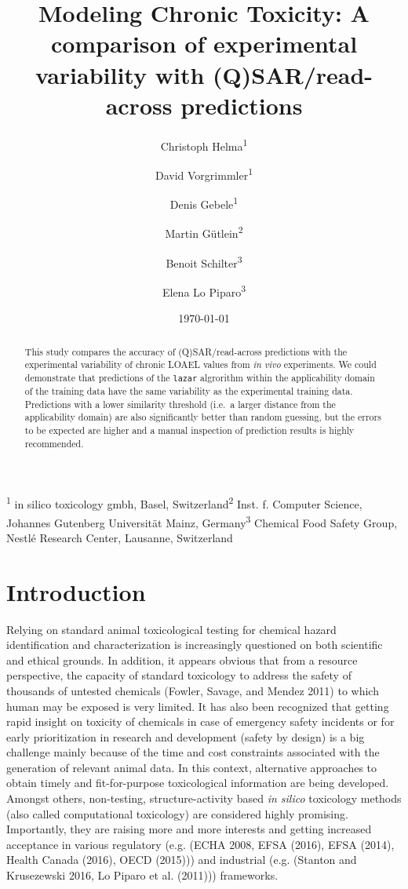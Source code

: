 \documentclass[]{achemso}
\title{Modeling Chronic Toxicity: A comparison of experimental variability with
(Q)SAR/read-across predictions}
\author{Christoph Helma\textsuperscript{1} \and David Vorgrimmler\textsuperscript{1} \and Denis Gebele\textsuperscript{1} \and Martin Gütlein\textsuperscript{2} \and Benoit Schilter\textsuperscript{3} \and Elena Lo Piparo\textsuperscript{3}}
\date{\today}
\begin{document}
\maketitle
\begin{abstract}
This study compares the accuracy of (Q)SAR/read-across predictions with
the experimental variability of chronic LOAEL values from \emph{in vivo}
experiments. We could demonstrate that predictions of the \texttt{lazar}
algrorithm within the applicability domain of the training data have the
same variability as the experimental training data. Predictions with a
lower similarity threshold (i.e.~a larger distance from the
applicability domain) are also significantly better than random
guessing, but the errors to be expected are higher and a manual
inspection of prediction results is highly recommended.
\end{abstract}

\textsuperscript{1} in silico toxicology gmbh, Basel,
Switzerland\newline\textsuperscript{2} Inst. f. Computer Science,
Johannes Gutenberg Universität Mainz, Germany\newline\textsuperscript{3}
Chemical Food Safety Group, Nestlé Research Center, Lausanne,
Switzerland

\section{Introduction}\label{introduction}

Relying on standard animal toxicological testing for chemical hazard
identification and characterization is increasingly questioned on both
scientific and ethical grounds. In addition, it appears obvious that
from a resource perspective, the capacity of standard toxicology to
address the safety of thousands of untested chemicals (Fowler, Savage,
and Mendez 2011) to which human may be exposed is very limited. It has
also been recognized that getting rapid insight on toxicity of chemicals
in case of emergency safety incidents or for early prioritization in
research and development (safety by design) is a big challenge mainly
because of the time and cost constraints associated with the generation
of relevant animal data. In this context, alternative approaches to
obtain timely and fit-for-purpose toxicological information are being
developed. Amongst others, non-testing, structure-activity based
\emph{in silico} toxicology methods (also called computational
toxicology) are considered highly promising. Importantly, they are
raising more and more interests and getting increased acceptance in
various regulatory (e.g. (ECHA 2008, EFSA (2016), EFSA (2014), Health
Canada (2016), OECD (2015))) and industrial (e.g. (Stanton and
Krusezewski 2016, Lo Piparo et al. (2011))) frameworks.
\end{document}
